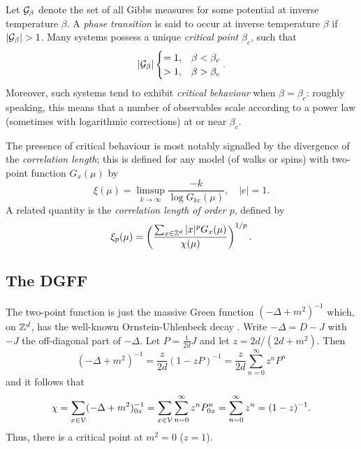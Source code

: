 Let $\mathcal{G}_\beta$ denote the set of all Gibbs measures for some potential at inverse temperature
$\beta$. A \emph{phase transition} is said to occur at inverse temperature $\beta$ if
$|\mathcal{G}_\beta| > 1$. Many systems possess a unique \emph{critical point} $\beta_c$, such that
\begin{equation}
|\mathcal{G}_\beta|
\begin{cases}
=1,  & \beta < \beta_c \\
> 1, & \beta > \beta_c
\end{cases}.
\end{equation}
Moreover, such systems tend to exhibit \emph{critical behaviour} when $\beta = \beta_c$:
roughly speaking, this means that a number of observables scale according to a power
law (sometimes with logarithmic corrections) at or near $\beta_c$.

The presence of critical behaviour is most notably signalled by the divergence of the
\emph{correlation length}; this is defined for any model (of walks or spins) with two-point
function $G_x(\mu)$ by
\begin{equation}
\xi(\mu) = \limsup_{k\to\infty} \frac{-k}{\log G_{ke}(\mu)}, \quad |e| = 1.
\end{equation}
A related quantity is the \emph{correlation length of order $p$}, defined by
\begin{equation}
\xi_p(\mu) = \left(\frac{\sum_{x\in{ {{\mathbb Z}}^d }} |x|^p G_x(\mu)}{\chi(\mu)}\right)^{1/p}.
\end{equation}


\subsection{The DGFF}

The two-point function is just the massive Green function $(-\Delta + m^2)^{-1}$
which, on ${ {{\mathbb Z}}^d }$, has the well-known Ornstein-Uhlenbeck decay . Write $-\Delta = D - J$ with $-J$ the off-diagonal part of
$-\Delta$. Let $P = \frac{1}{2 d} J$ and let $z = 2 d / (2 d + m^2)$. Then
\begin{equation}
(-\Delta + m^2)^{-1}
  =
\frac{z}{2 d} (1 - z P)^{-1}
  =
\frac{z}{2 d} \sum_{n=0}^\infty z^n P^n
\end{equation}
and it follows that
\begin{equation}
\chi
  =
\sum_{x\in\mathcal{V}} (-\Delta + m^2)^{-1}_{0x}
  =
\sum_{x\in\mathcal{V}} \sum_{n=0}^\infty z^n P^n_{0x}
  =
\sum_{n=0}^\infty z^n
  =
(1 - z)^{-1}.
\end{equation}
Thus, there is a critical point at $m^2 = 0$ ($z = 1$).

